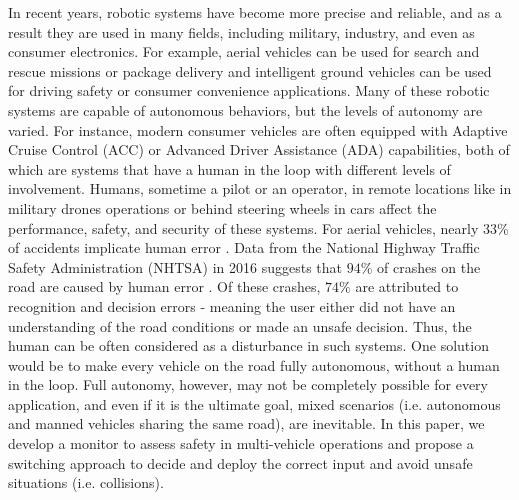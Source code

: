 \documentclass[letterpaper, 10 pt, conference]{ieeeconf}  %
\begin{document}
In recent years, robotic systems have become more precise and reliable, and as a result they are used in many fields, including military, industry, and even as consumer electronics. For example, aerial vehicles can be used for search and rescue missions or package delivery and intelligent ground vehicles can be used for driving safety or consumer convenience applications. Many of these robotic systems are capable of autonomous behaviors, but the levels of autonomy are varied. For instance, modern consumer vehicles are often equipped with Adaptive Cruise Control (ACC)\cite{acc} or Advanced Driver Assistance (ADA)\cite{adas} capabilities, both of which are systems that have a human in the loop with different levels of involvement. Humans, sometime a pilot or an operator, in remote locations like in military drones operations or behind steering wheels in cars affect the performance, safety, and security of these systems. For aerial vehicles, nearly 33\% of accidents implicate human error \cite{aviacc}. Data from the National Highway Traffic Safety Administration (NHTSA) in 2016 suggests that $94\%$ of crashes on the road are caused by human error \cite{nhtsa}. Of these crashes, $74\%$ are attributed to recognition and decision errors - meaning the user either did not have an understanding of the road conditions or made an unsafe decision. Thus, the human can be often considered as a disturbance in such systems. One solution would be to make every vehicle on the road fully autonomous, without a human in the loop. Full autonomy, however, may not be completely possible for every application, and even if it is the ultimate goal, mixed scenarios (i.e. autonomous and manned vehicles sharing the same road), are inevitable. In this paper, we develop a monitor to assess safety in multi-vehicle operations and propose a switching approach to decide and deploy the correct input and avoid unsafe situations (i.e. collisions).
\end{document}

